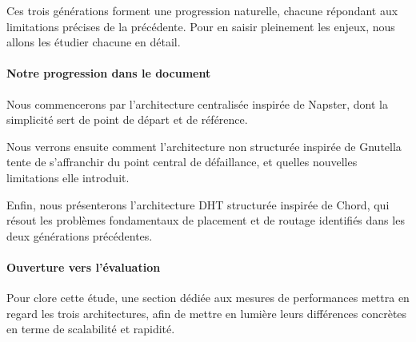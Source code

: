 Ces trois générations forment une progression naturelle, chacune répondant aux limitations précises de la précédente. Pour en saisir pleinement les enjeux, nous allons les étudier chacune en détail.

\paragraph{Notre progression dans le document}
Nous commencerons par l'architecture centralisée inspirée de Napster, dont la simplicité sert de point de départ et de référence.

Nous verrons ensuite comment l'architecture non structurée inspirée de Gnutella tente de s'affranchir du point central de défaillance, et quelles nouvelles limitations elle introduit.

Enfin, nous présenterons l'architecture DHT structurée inspirée de Chord, qui résout les problèmes fondamentaux de placement et de routage identifiés dans les deux générations précédentes.

\paragraph{Ouverture vers l'évaluation}
Pour clore cette étude, une section dédiée aux mesures de performances mettra en regard les trois architectures, afin de mettre en lumière leurs différences concrètes en terme de scalabilité et rapidité.

